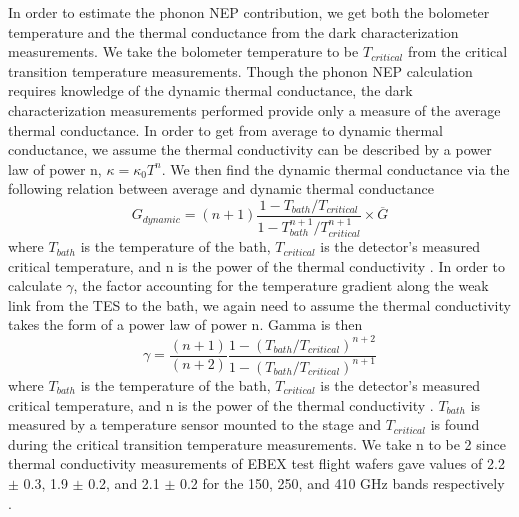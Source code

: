In order to estimate the phonon \ac{NEP} contribution, we get both the bolometer temperature and the thermal conductance from the dark characterization measurements. 
We take the bolometer temperature to be $T_{critical}$ from the critical transition temperature measurements. 
Though the phonon \ac{NEP} calculation requires knowledge of the dynamic thermal conductance, the dark characterization measurements performed provide only a measure of the average thermal conductance. 
In order to get from average to dynamic thermal conductance, we assume the thermal conductivity can be described by a power law of power n, $\kappa = \kappa_{0} T^{n}$.
We then find the dynamic thermal conductance via the following relation between average and dynamic thermal conductance
\begin{equation}
G_{dynamic} = (n+1) \frac{1 - T_{bath}/T_{critical}}{1 - T_{bath}^{n+1}/T_{critical}^{n+1}} \times \overline{G}
\end{equation}
where $T_{bath}$ is the temperature of the bath, $T_{critical}$ is the detector's measured critical temperature, and n is the power of the thermal conductivity \citep{mather_appliedoptics_1982}. 
In order to calculate $\gamma$, the factor accounting for the temperature gradient along the weak link from the TES to the bath, we again need to assume the thermal conductivity takes the form of a power law of power n. 
Gamma is then
\begin{equation}
\gamma = \frac{(n+1)}{(n+2)} \frac{1 - (T_{bath}/T_{critical})^{n+2}}{1 - (T_{bath}/T_{critical})^{n+1}}
\end{equation}
where $T_{bath}$ is the temperature of the bath, $T_{critical}$ is the detector's measured critical temperature, and n is the power of the thermal conductivity \citep{mather_appliedoptics_1982}. 
$T_{bath}$ is measured by a temperature sensor mounted to the stage and $T_{critical}$ is found during the critical transition temperature measurements.
We take n to be 2 since thermal conductivity measurements of \ac{EBEX} test flight wafers gave values of 2.2 $\pm$ 0.3, 1.9 $\pm$ 0.2, and 2.1 $\pm$ 0.2 for the 150, 250, and 410 GHz bands respectively \cite{hubmayr_thesis}.

